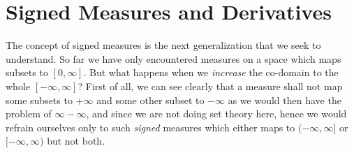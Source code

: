 \documentclass{article}
\theoremstyle{definition}
\theoremstyle{remark}
\theoremstyle{definition}
\theoremstyle{definition}
\theoremstyle{definition}
\begin{document}
\section{Signed Measures and Derivatives}
The concept of signed measures is the next generalization that we seek to understand. So far we have only encountered measures on a space which maps subsets to $ [0,\infty] $. But what happens when we \emph{increase} the co-domain to the whole $ [-\infty,\infty] $? First of all, we can see clearly that a measure shall not map some subsets to $ +\infty $ and some other subset to $ -\infty $ as we would then have the problem of $ \infty - \infty $, and since we are not doing set theory here, hence we would refrain ourselves only to such \emph{signed} measures which either maps to $(-\infty, \infty]  $ or $ [-\infty,\infty) $ but not both. 
\end{document}
